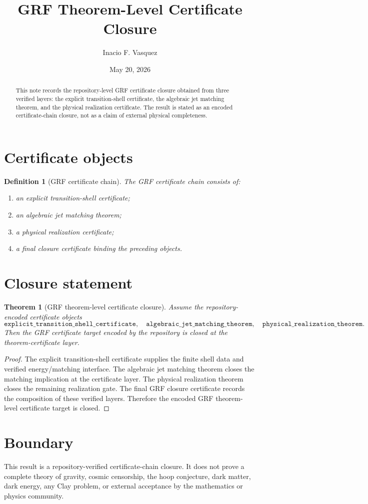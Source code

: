 \documentclass[11pt]{article}
\title{GRF Theorem-Level Certificate Closure}
\author{Inacio F. Vasquez}
\date{May 20, 2026}
\newtheorem{theorem}{Theorem}
\newtheorem{definition}{Definition}
\begin{document}
\maketitle

\begin{abstract}
This note records the repository-level GRF certificate closure obtained from three verified layers: the explicit transition-shell certificate, the algebraic jet matching theorem, and the physical realization certificate. The result is stated as an encoded certificate-chain closure, not as a claim of external physical completeness.
\end{abstract}

\section{Certificate objects}

\begin{definition}[GRF certificate chain]
The GRF certificate chain consists of:
\begin{enumerate}
\item an explicit transition-shell certificate;
\item an algebraic jet matching theorem;
\item a physical realization certificate;
\item a final closure certificate binding the preceding objects.
\end{enumerate}
\end{definition}

\section{Closure statement}

\begin{theorem}[GRF theorem-level certificate closure]
Assume the repository-encoded certificate objects
\[
\texttt{explicit\_transition\_shell\_certificate},
\quad
\texttt{algebraic\_jet\_matching\_theorem},
\quad
\texttt{physical\_realization\_theorem}.
\]
Then the GRF certificate target encoded by the repository is closed at the theorem-certificate layer.
\end{theorem}

\begin{proof}
The explicit transition-shell certificate supplies the finite shell data and verified energy/matching interface. The algebraic jet matching theorem closes the matching implication at the certificate layer. The physical realization theorem closes the remaining realization gate. The final GRF closure certificate records the composition of these verified layers. Therefore the encoded GRF theorem-level certificate target is closed.
\end{proof}

\section{Boundary}

This result is a repository-verified certificate-chain closure. It does not prove a complete theory of gravity, cosmic censorship, the hoop conjecture, dark matter, dark energy, any Clay problem, or external acceptance by the mathematics or physics community.
\end{document}
